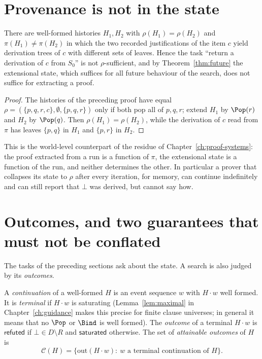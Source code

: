 \section{Provenance is not in the state}

\begin{proposition}
\label{prop:prov-not-state}
There are well-formed histories $H_1,H_2$ with $\rho(H_1)=\rho(H_2)$ and $\pi(H_1)\ne\pi(H_2)$ in which the two recorded justifications of the item $c$ yield derivation trees of $c$ with different sets of leaves. Hence the task ``return a derivation of $c$ from $S_0$'' is not $\rho$-sufficient, and by Theorem~\ref{thm:future} the extensional state, which suffices for all future behaviour of the search, does not suffice for extracting a proof.
\end{proposition}

\begin{proof}
The histories of the preceding proof have equal $\rho=(\{p,q,r,c\},\emptyset,\{p,q,r\})$ only if both pop all of $p,q,r$; extend $H_1$ by $\Pop(r)$ and $H_2$ by $\Pop(q)$. Then $\rho(H_1)=\rho(H_2)$, while the derivation of $c$ read from $\pi$ has leaves $\{p,q\}$ in $H_1$ and $\{p,r\}$ in $H_2$.
\end{proof}

This is the world-level counterpart of the residue of Chapter~\ref{ch:proof-systems}: the proof extracted from a run is a function of $\pi$, the extensional state is a function of the run, and neither determines the other. In particular a prover that collapses its state to $\rho$ after every iteration, for memory, can continue indefinitely and can still report that $\bot$ was derived, but cannot say how.

\section{Outcomes, and two guarantees that must not be conflated}

The tasks of the preceding sections ask about the state. A search is also judged by its \emph{outcomes}.

\begin{definition}
\label{def:outcomes-worlds}
A \emph{continuation} of a well-formed $H$ is an event sequence $w$ with $H\cdot w$ well formed. It is \emph{terminal} if $H\cdot w$ is saturating (Lemma~\ref{lem:maximal} in Chapter~\ref{ch:guidance} makes this precise for finite clause universes; in general it means that no $\Pop$ or $\Bind$ is well formed). The \emph{outcome} of a terminal $H\cdot w$ is $\mathsf{refuted}$ if $\bot\in D\setminus R$ and $\mathsf{saturated}$ otherwise. The set of \emph{attainable outcomes} of $H$ is
\[
\mathcal C(H)=\{\mathrm{out}(H\cdot w):\ w\text{ a terminal continuation of }H\}.
\]
\end{definition}


